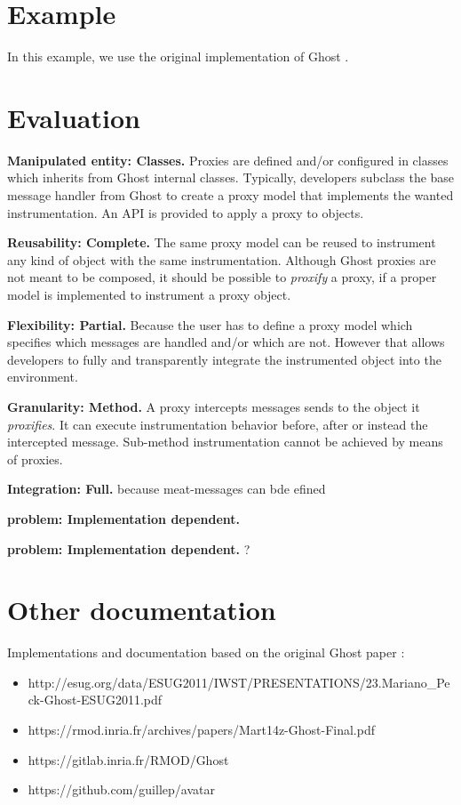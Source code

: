 \documentclass[10pt,twoside,english]{_support/latex/sbabook/sbabook}
\begin{document}
\section{Example}
In this example, we use the original implementation of Ghost \cite{Mart14z}.
\section{Evaluation}
\textbf{Manipulated entity: Classes.} Proxies are defined and/or configured in classes which inherits from Ghost internal classes. Typically, developers subclass the base message handler from Ghost to create a proxy model that implements the wanted instrumentation. An API is provided to apply a proxy to objects.

\textbf{Reusability: Complete.} The same proxy model can be reused to instrument any kind of object with the same instrumentation. Although Ghost proxies are not meant to be composed, it should be possible to \textit{proxify} a proxy, if a proper model is implemented to instrument a proxy object.

\textbf{Flexibility: Partial.} Because the user has to define a proxy model which specifies which messages are handled and/or which are not. However that allows developers to fully and transparently integrate the instrumented object into the environment.

\textbf{Granularity: Method.} A proxy intercepts messages sends to the object it \textit{proxifies}. It can execute instrumentation behavior before, after or instead the intercepted message. Sub-method instrumentation cannot be achieved by means of proxies.

\textbf{Integration: Full.} because meat-messages can bde efined

\textbf{ problem: Implementation dependent.}

\textbf{ problem: Implementation dependent.} ?
\section{Other documentation}
Implementations and documentation based on the original Ghost paper \cite{Mart14z}:

\begin{itemize}
\item http://esug.org/data/ESUG2011/IWST/PRESENTATIONS/23.Mariano\_Peck-Ghost-ESUG2011.pdf
\item https://rmod.inria.fr/archives/papers/Mart14z-Ghost-Final.pdf
\item https://gitlab.inria.fr/RMOD/Ghost
\item https://github.com/guillep/avatar
\end{itemize}
\end{document}
